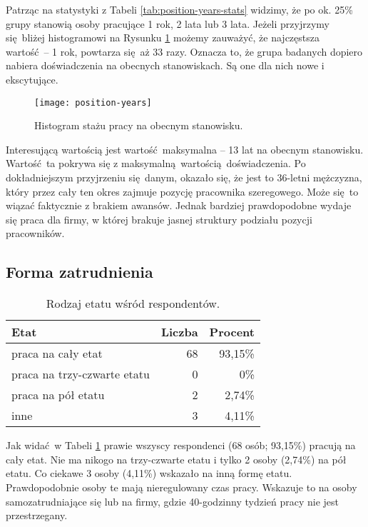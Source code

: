 Patrząc na statystyki z Tabeli \ref{tab:position-years-stats} widzimy, że po ok. 25\% grupy stanowią osoby pracujące 1 rok, 2 lata lub 3 lata. Jeżeli przyjrzymy się bliżej histogramowi na Rysunku \ref{fig:position-years} możemy zauważyć, że najczęstsza wartość -- 1 rok, powtarza się aż 33 razy. Oznacza to, że grupa badanych dopiero nabiera doświadczenia na obecnych stanowiskach. Są one dla nich nowe i ekscytujące.

\begin{figure}[h]
\begin{center}
\texttt{[image: position-years]}
\end{center}
\caption{Histogram stażu pracy na obecnym stanowisku.}
\label{fig:position-years}
\end{figure}

Interesującą wartością jest wartość maksymalna -- 13 lat na obecnym stanowisku. Wartość ta pokrywa się z maksymalną wartością doświadczenia. Po dokładniejszym przyjrzeniu się danym, okazało się, że jest to 36-letni mężczyzna, który przez cały ten okres zajmuje pozycję pracownika szeregowego. Może się to wiązać faktycznie z brakiem awansów. Jednak bardziej prawdopodobne wydaje się praca dla firmy, w której brakuje jasnej struktury podziału
pozycji pracowników.

\subsection{Forma zatrudnienia}

\begin{table}[h!]
\begin{center}
\begin{tabular}{l r r}
Etat & Liczba & Procent \\ \hline
praca na cały etat & 68 & 93,15\% \\
praca na trzy-czwarte etatu & 0 & 0\% \\
praca na pół etatu & 2 & 2,74\% \\
inne & 3 & 4,11\% \\
\end{tabular}
\end{center}
\caption{Rodzaj etatu wśród respondentów.}
\label{tab:work-time-stats}
\end{table}

Jak widać w Tabeli \ref{tab:work-time-stats} prawie wszyscy respondenci (68 osób; 93,15\%) pracują na cały etat. Nie ma nikogo na trzy-czwarte etatu i tylko 2 osoby (2,74\%) na pół etatu. Co ciekawe 3 osoby (4,11\%) wskazało na inną formę etatu. Prawdopodobnie osoby te mają nieregulowany czas pracy. Wskazuje to na osoby samozatrudniające się lub na firmy, gdzie 40-godzinny tydzień pracy nie jest przestrzegany.

